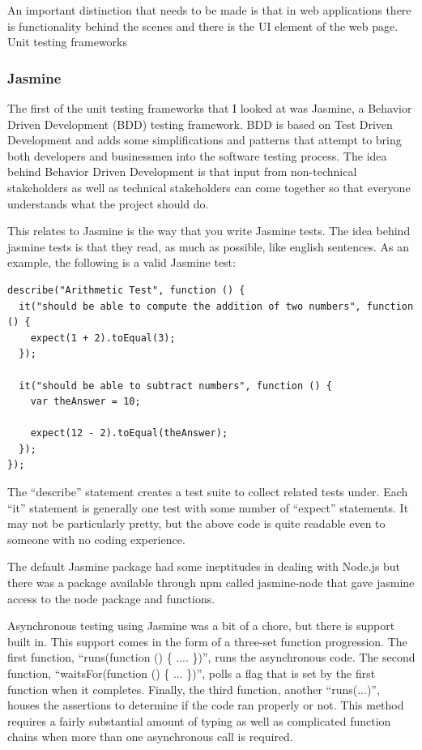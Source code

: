 \documentclass[11pt]{article}
\begin{document}
An important distinction that needs to be made is that in web applications there is functionality behind the scenes and there is the UI element of the web page. Unit testing frameworks 

\subsubsection{Jasmine \cite{Jasmine}}
The first of the unit testing frameworks that I looked at was Jasmine, a Behavior Driven Development (BDD) testing framework. BDD is based on Test Driven Development and adds some simplifications and patterns that attempt to bring both developers and businessmen into the software testing process. The idea behind Behavior Driven Development is that input from non-technical stakeholders as well as technical stakeholders can come together so that everyone understands what the project should do.

This relates to Jasmine is the way that you write Jasmine tests. The idea behind jasmine tests is that they read, as much as possible, like english sentences. As an example, the following is a valid Jasmine test:
\begin{lstlisting}
describe("Arithmetic Test", function () {
  it("should be able to compute the addition of two numbers", function () {
    expect(1 + 2).toEqual(3);
  });

  it("should be able to subtract numbers", function () {
    var theAnswer = 10;

    expect(12 - 2).toEqual(theAnswer);
  });
});
\end{lstlisting}
The ``describe'' statement creates a test suite to collect related tests under. Each ``it'' statement is generally one test with some number of ``expect'' statements. It may not be particularly pretty, but the above code is quite readable even to someone with no coding experience.

The default Jasmine package had some ineptitudes in dealing with Node.js but there was a package available through npm called jasmine-node \cite{JasmineNode} that gave jasmine access to the node package and functions. 

Asynchronous testing using Jasmine was a bit of a chore, but there is support built in. This support comes in the form of a three-set function progression. The first function, ``runs(function () \{ .... \})'', runs the asynchronous code. The second function, ``waitsFor(function () \{ ... \})'', polls a flag that is set by the first function when it completes. Finally, the third function, another ``runs(...)'', houses the assertions to determine if the code ran properly or not. This method requires a fairly substantial amount of typing as well as complicated function chains when more than one asynchronous call is required.
\end{document}
